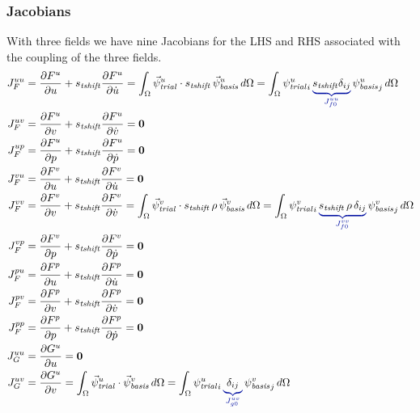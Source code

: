 \subsubsection{Jacobians}

With three fields we have nine Jacobians for the LHS and RHS associated with the coupling of 
the three fields.
\begin{align}
  J_F^{uu} &= \frac{\partial F^u}{\partial u} + s_\mathit{tshift} \frac{\partial F^u}{\partial 
\dot{u}} = \int_\Omega 
\trialvec[u] \cdot s_\mathit{tshift}\,\basisvec[u] \, d\Omega = \int_\Omega \trialscalar[u]_i 
\, 
\eqnannotate{s_\mathit{tshift} \delta_{ij}}{J_{f0}^{uu}} \, \basisscalar[u]_j \, d\Omega \\
  J_F^{uv} &= \frac{\partial F^u}{\partial v} + s_\mathit{tshift} \frac{\partial F^u}{\partial 
\dot{v}} = \tensor{0} \\
  J_F^{up} &= \frac{\partial F^u}{\partial p} + s_\mathit{tshift} \frac{\partial F^u}{\partial 
\dot{p}} = \tensor{0} \\
%
  J_F^{vu} &= \frac{\partial F^v}{\partial u} + s_\mathit{tshift} \frac{\partial F^v}{\partial 
\dot{u}} = \tensor{0} \\
  J_F^{vv} &= \frac{\partial F^v}{\partial v} + s_\mathit{tshift} \frac{\partial F^v}{\partial 
\dot{v}} = \int_\Omega 
\trialvec[v] \cdot s_\mathit{tshift}\,\rho\,\basisvec[v] \, d\Omega = \int_\Omega 
\trialscalar[v]_i \, 
\eqnannotate{s_\mathit{tshift} \, \rho \, \delta_{ij}}{J_{f0}^{vv}} \, \basisscalar[v]_j \, 
d\Omega \\
  J_F^{vp} &= \frac{\partial F^v}{\partial p} + s_\mathit{tshift} \frac{\partial F^v}{\partial 
\dot{p}} = \tensor{0} \\
%
  J_F^{pu} &= \frac{\partial F^p}{\partial u} + s_\mathit{tshift} \frac{\partial F^p}{\partial 
\dot{u}} = \tensor{0} \\
  J_F^{pv} &= \frac{\partial F^p}{\partial v} + s_\mathit{tshift} \frac{\partial F^p}{\partial 
\dot{v}} = \tensor{0} \\
  J_F^{pp} &= \frac{\partial F^p}{\partial p} + s_\mathit{tshift} \frac{\partial F^p}{\partial 
\dot{p}} = \tensor{0} \\
%
  J_G^{uu} &= \frac{\partial G^u}{\partial u} = \tensor{0} \\
  J_G^{uv} &= \frac{\partial G^u}{\partial v} = \int_\Omega \trialvec[u] \cdot \basisvec[v] \, 
d\Omega = 
\int_\Omega \trialscalar[u]_i \, \eqnannotate{\delta_{ij}}{J_{g0}^{uv}} \, \basisscalar[v]_j 
\, d\Omega \\

\end{align}
